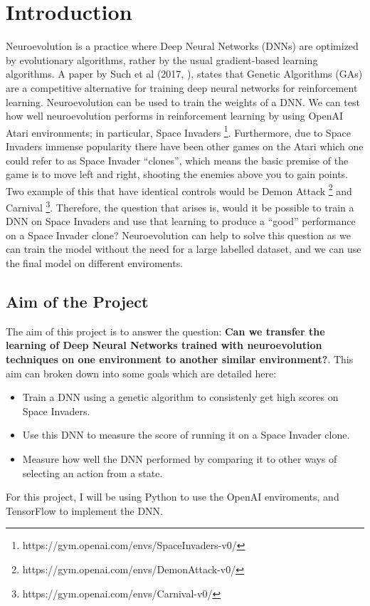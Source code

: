 \chapter{Introduction}

Neuroevolution is a practice where Deep Neural Networks (DNNs) are optimized by evolutionary algorithms, rather by the usual gradient-based learning algorithms. A paper by Such et al (2017, \cite{such}), states that Genetic Algorithms (GAs) are a competitive alternative for training deep neural networks for reinforcement learning. Neuroevolution can be used to train the weights of a DNN. We can test how well neuroevolution performs in reinforcement learning by using OpenAI Atari environments; in particular, Space Invaders \footnote{https://gym.openai.com/envs/SpaceInvaders-v0/}. Furthermore, due to Space Invaders immense popularity there have been other games on the Atari which one could refer to as Space Invader ``clones'', which means the basic premise of the game is to move left and right, shooting the enemies above you to gain points. Two example of this that have identical controls would be  Demon Attack \footnote{https://gym.openai.com/envs/DemonAttack-v0/} and Carnival \footnote{https://gym.openai.com/envs/Carnival-v0/}. Therefore, the question that arises is, would it be possible to train a DNN on Space Invaders and use that learning to produce a ``good'' performance on a Space Invader clone? Neuroevolution can help to solve this question as we can train the model without the need for a large labelled dataset, and we can use the final model on different enviroments.

\section{Aim of the Project}

The aim of this project is to answer the question: \textbf{Can we transfer the learning of Deep Neural Networks trained with neuroevolution techniques on one environment to another similar environment?}. This aim can broken down into some goals which are detailed here:
\begin{itemize}
  \item Train a DNN using a genetic algorithm to consistenly get high scores on Space Invaders.
  \item Use this DNN to measure the score of running it on a Space Invader clone.
  \item Measure how well the DNN performed by comparing it to other ways of selecting an action from a state.
\end{itemize}

For this project, I will be using Python to use the OpenAI enviroments, and TensorFlow to implement the DNN.
